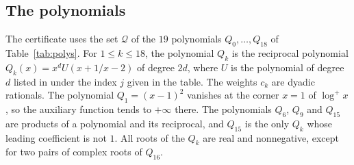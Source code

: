 \documentclass[11pt]{amsart}
\theoremstyle{remark}
\numberwithin{equation}{section}
\newcommand{\logp}{\log^{+}}
\newcommand{\NPoly}{19}
\begin{document}
\subsection{The polynomials}
The certificate uses the set $\mathcal Q$ of the $\NPoly$ polynomials $Q_0,\dots,Q_{18}$ of Table~\ref{tab:polys}. For $1\le k\le18$, the polynomial $Q_k$ is the reciprocal polynomial $Q_k(x)=x^{d}U(x+1/x-2)$ of degree $2d$, where $U$ is the polynomial of degree $d$ listed in \cite[Table~1]{Fla15} under the index $j$ given in the table. The weights $c_k$ are dyadic rationals. The polynomial $Q_1=(x-1)^2$ vanishes at the corner $x=1$ of $\logp x$, so the auxiliary function tends to $+\infty$ there. The polynomials $Q_6$, $Q_9$ and $Q_{15}$ are products of a polynomial and its reciprocal, and $Q_{15}$ is the only $Q_k$ whose leading coefficient is not $1$. All roots of the $Q_k$ are real and nonnegative, except for two pairs of complex roots of $Q_{16}$.
\end{document}
